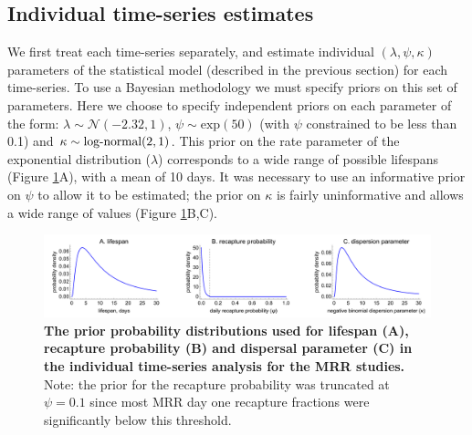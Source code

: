 \documentclass[12pt]{article}
\begin{document}
\subsection{Individual time-series estimates}\label{sec:MRR_individual_analysis}
We first treat each time-series separately, and estimate individual $(\lambda,\psi,\kappa)$ parameters of the statistical model (described in the previous section) for each time-series. To use a Bayesian methodology we must specify priors on this set of parameters. Here we choose to specify independent priors on each parameter of the form: $\lambda\sim \mathcal{N}(-2.32,1)$, $\psi\sim \text{exp}(50)$ (with $\psi$ constrained to be less than 0.1) and $\kappa\sim \textnormal{log-normal}(2,1)$. This prior on the rate parameter of the exponential distribution ($\lambda$) corresponds to a wide range of possible lifespans (Figure \ref{fig:mrr_individualTimeSeries_priors}A), with a mean of 10 days. It was necessary to use an informative prior on $\psi$ to allow it to be estimated; the prior on $\kappa$ is fairly uninformative and allows a wide range of values (Figure \ref{fig:mrr_individualTimeSeries_priors}B,C). 


\begin{figure}[h]
	\centerline{\includegraphics[width=1.25\textwidth]{./Figure_files/mrr_individualTimeSeries_priors.pdf}}
	\caption{\textbf{The prior probability distributions used for lifespan (A), recapture probability (B) and dispersal parameter (C) in the individual time-series analysis for the MRR studies.} Note: the prior for the recapture probability was truncated at $\psi=0.1$ since most MRR day one recapture fractions were significantly below this threshold.}
	\label{fig:mrr_individualTimeSeries_priors}
\end{figure}
\end{document}
